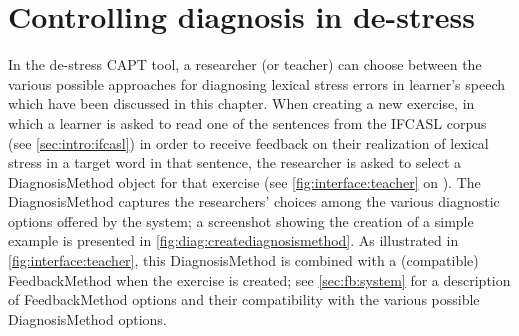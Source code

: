 %

\section{Controlling diagnosis in de-stress}
\label{sec:diag:system}

	In the de-stress CAPT tool, a  researcher (or teacher) can choose between the various possible approaches for diagnosing lexical stress errors in learner's speech which have been discussed in this chapter. 
	When creating a new exercise, in which a learner is asked to read one of the sentences from the IFCASL corpus (see \cref{sec:intro:ifcasl}) in order to receive feedback on their realization of lexical stress in a target word in that sentence, the researcher is asked to select a DiagnosisMethod object for that exercise (see \cref{fig:interface:teacher} on ). The DiagnosisMethod captures the researchers' choices among the various diagnostic options offered by the system; a screenshot showing the creation of a simple example is presented in \cref{fig:diag:creatediagnosismethod}. As illustrated in \cref{fig:interface:teacher}, this DiagnosisMethod is combined with a (compatible) FeedbackMethod when the exercise is created; see \cref{sec:fb:system} for a description of FeedbackMethod options and their compatibility with the various possible DiagnosisMethod options. 
	
